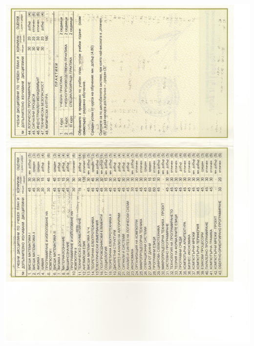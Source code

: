 \documentclass[bulgarian,a4paper]{europasscv}
\begin{document}
\includegraphics[width=\textwidth,height=\textheight,keepaspectratio]{DiplomaTU2010_4}
\end{document}
